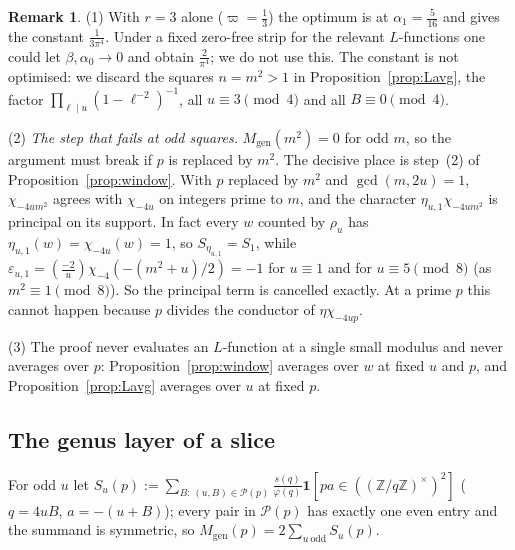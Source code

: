 \documentclass[11pt,reqno]{amsart}
\theoremstyle{definition}
\newtheorem{remark}[theorem]{Remark}
\newcommand{\Z}{\mathbb Z}
\newcommand{\eps}{\varepsilon}
\newcommand{\leg}[2]{\left(\frac{#1}{#2}\right)}
\newcommand{\cP}{\mathcal P}
\newcommand{\Mgen}{M_{\mathrm{gen}}}
\begin{document}
\begin{remark}\label{rem:U}
(1) With $r=3$ alone ($\varpi=\frac13$) the optimum is at $\alpha_1=\frac5{16}$
and gives the constant $\frac1{3\pi^4}$.  Under a fixed zero-free strip
for the relevant $L$-functions one could let $\beta,\alpha_0\to0$ and
obtain $\frac2{\pi^4}$; we do not use this.  The constant is not
optimised: we discard the squares $n=m^2>1$ in
Proposition~\ref{prop:Lavg}, the factor $\prod_{\ell\mid
u}(1-\ell^{-2})^{-1}$, all $u\equiv3\pmod 4$ and all $B\equiv0\pmod4$.

(2) \emph{The step that fails at odd squares.}  $\Mgen(m^2)=0$ for odd
$m$, so the argument must break if $p$ is replaced by $m^2$.  The
decisive place is step~(2) of Proposition~\ref{prop:window}.  With $p$
replaced by $m^2$ and $\gcd(m,2u)=1$, $\chi_{-4um^2}$ agrees with
$\chi_{-4u}$ on integers prime to $m$, and the character
$\eta_{u,1}\chi_{-4um^2}$ is principal on its support.  In fact every $w$
counted by $\rho_u$ has $\eta_{u,1}(w)=\chi_{-4u}(w)=1$, so
$S_{\eta_{u,1}}=S_1$, while
$\eps_{u,1}=\leg{-2}{u}\chi_{-4}(-(m^2+u)/2)=-1$ for $u\equiv1$ and for
$u\equiv5\pmod8$ (as $m^2\equiv1\pmod 8$).  So the principal term is
cancelled exactly.  At a prime $p$ this cannot happen because $p$
divides the conductor of $\eta\chi_{-4up}$.

(3) The proof never evaluates an $L$-function at a single small
modulus and never averages over $p$: Proposition~\ref{prop:window}
averages over $w$ at fixed $u$ and $p$, and Proposition~\ref{prop:Lavg}
averages over $u$ at fixed $p$.
\end{remark}

\subsection{The genus layer of a slice}
For odd $u$ let $S_u(p):=\sum_{B:\,(u,B)\in\cP(p)}\frac{s(q)}{\varphi(q)}
\mathbf 1[pa\in((\Z/q\Z)^\times)^2]$ ($q=4uB$, $a=-(u+B)$); every pair in
$\cP(p)$ has exactly one even entry and the summand is symmetric, so
$\Mgen(p)=2\sum_{u\ \mathrm{odd}}S_u(p)$.
\end{document}
